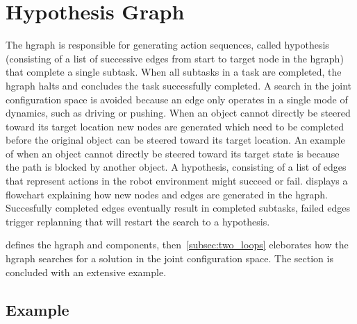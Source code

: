 \section{Hypothesis Graph}%
\label{sec:hgraph}
The \ac{hgraph} is responsible for generating action sequences, called hypothesis (consisting of a list of successive edges from start to target node in the \ac{hgraph}) that complete a single subtask. When all subtasks in a task are completed, the \ac{hgraph} halts and concludes the task successfully completed. A search in the joint configuration space is avoided because an edge only operates in a single mode of dynamics, such as driving or pushing. When an object cannot directly be steered toward its target location new nodes are generated which need to be completed before the original object can be steered toward its target location. An example of when an object cannot directly be steered toward its target state is because the path is blocked by another object. A hypothesis, consisting of a list of edges that represent actions in the robot environment might succeed or fail.  displays a flowchart explaining how new nodes and edges are generated in the \ac{hgraph}. Succesfully completed edges eventually result in completed subtasks, failed edges trigger replanning that will restart the search to a hypothesis.\bs

 defines the \ac{hgraph} and components, then~\cref{subsec:two_loops} eleborates how the \ac{hgraph} searches for a solution in the joint configuration space. The section is concluded with an extensive example.\bs









\subsection{Example}%
\label{subsec:hgraph_example}

